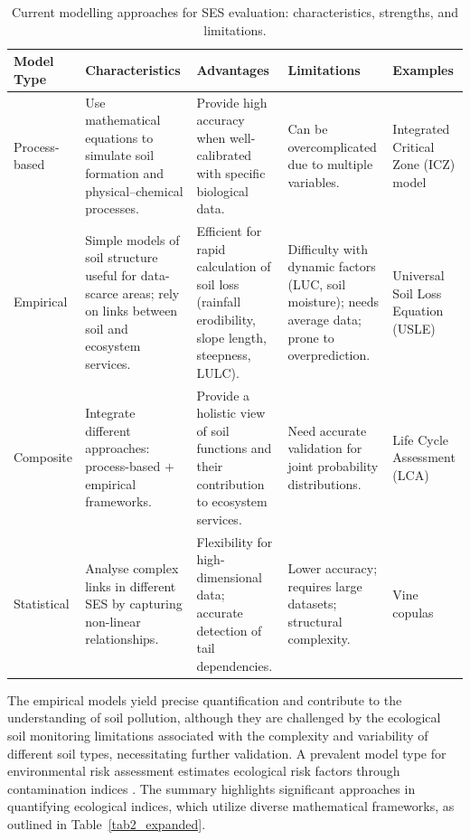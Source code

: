 \documentclass[environments,article,submit,pdftex,moreauthors]{Definitions/mdpi}
\begin{document}
\begin{table}[H]
\caption{Current modelling approaches for SES evaluation: characteristics,
    strengths, and limitations.\label{tab3}}
\begin{tabularx}{\textwidth}{@{} p{1.6cm} p{2.7cm} p{2.5cm} p{3.0cm} X @{}}
\toprule
\textbf{Model Type} & \textbf{Characteristics} & \textbf{Advantages}
    & \textbf{Limitations} & \textbf{Examples} \\
\midrule
Process-based
    & Use mathematical equations to simulate soil formation and
      physical--chemical processes.
    & Provide high accuracy when well-calibrated with specific biological
      data.
    & Can be overcomplicated due to multiple variables.
    & Integrated Critical Zone (ICZ) model \cite{Giannakis2017} \\[6pt]
Empirical
    & Simple models of soil structure useful for data-scarce areas; rely on
      links between soil and ecosystem services.
    & Efficient for rapid calculation of soil loss (rainfall erodibility,
      slope length, steepness, LULC).
    & Difficulty with dynamic factors (LUC, soil moisture); needs average
      data; prone to overprediction.
    & Universal Soil Loss Equation (USLE) \cite{Benavidez2018} \\[6pt]
Composite
    & Integrate different approaches: process-based $+$ empirical
      frameworks.
    & Provide a holistic view of soil functions and their contribution to
      ecosystem services.
    & Need accurate validation for joint probability distributions.
    & Life Cycle Assessment (LCA) \cite{Sadhukhan2022} \\[6pt]
Statistical
    & Analyse complex links in different SES by capturing non-linear
      relationships.
    & Flexibility for high-dimensional data; accurate detection of tail
      dependencies.
    & Lower accuracy; requires large datasets; structural complexity.
    & Vine copulas \cite{Luetal2020} \\
\bottomrule
\end{tabularx}
\end{table}

The empirical models yield precise quantification and contribute to the
understanding of soil pollution, although they are challenged by the ecological
soil monitoring limitations associated with the complexity and variability of
different soil types, necessitating further validation. A prevalent model type
for environmental risk assessment estimates ecological risk factors through
contamination indices
\cite{Stojic2019,Mohammad2025,Sun2025,Edo2024,Chon2011,Ferreira2022}. The
summary highlights significant approaches in quantifying ecological indices,
which utilize diverse mathematical frameworks, as outlined in
Table~\ref{tab2_expanded}.
\end{document}
